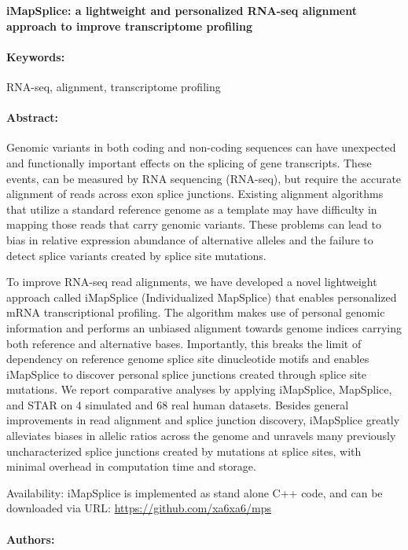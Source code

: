 \noindent
\large {\bf iMapSplice: a lightweight and personalized RNA-seq alignment approach to improve transcriptome profiling} 


\normalsize 


\noindent \paragraph{Keywords:} RNA-seq, alignment, transcriptome profiling

\noindent \paragraph{Abstract:} 


Genomic variants in both coding and non-coding sequences can have unexpected and
functionally important effects on the splicing of gene transcripts. These events, can be measured by
RNA sequencing (RNA-seq), but require the accurate alignment of reads across exon splice junctions.
Existing alignment algorithms that utilize a standard reference genome as a template may have difficulty in
mapping those reads that carry genomic variants. These problems can lead to bias in relative expression
abundance of alternative alleles and the failure to detect splice variants created by splice site mutations.

 To improve RNA-seq read alignments, we have developed a novel lightweight approach called
iMapSplice (Individualized MapSplice) that enables personalized mRNA transcriptional profiling. The
algorithm makes use of personal genomic information and performs an unbiased alignment towards
genome indices carrying both reference and alternative bases. Importantly, this breaks the limit of
dependency on reference genome splice site dinucleotide motifs and enables iMapSplice to discover
personal splice junctions created through splice site mutations. We report comparative analyses by
applying iMapSplice, MapSplice, and STAR on 4 simulated and 68 real human datasets. Besides general
improvements in read alignment and splice junction discovery, iMapSplice greatly alleviates biases in
allelic ratios across the genome and unravels many previously uncharacterized splice junctions created
by mutations at splice sites, with minimal overhead in computation time and storage.

Availability: iMapSplice is implemented as stand alone C++ code, and can be downloaded via URL:
\url{https://github.com/xa6xa6/mps}

\noindent \paragraph{Authors:} 

